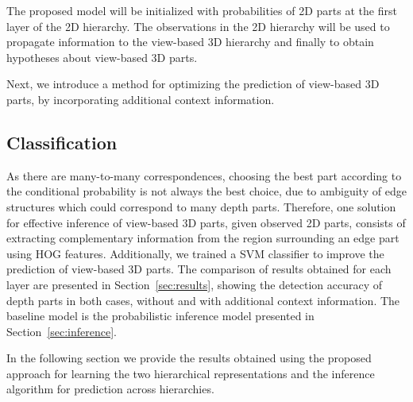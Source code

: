 \documentclass[conference]{IEEEtran}
\begin{document}
The proposed model will be initialized with probabilities of 2D parts at the first layer of the 2D hierarchy. The observations in the 2D hierarchy will be used to propagate information to the view-based 3D hierarchy and finally to obtain hypotheses about view-based 3D parts. 

Next, we introduce a method for optimizing the prediction of view-based 3D parts, by incorporating additional context information.

\subsection{Classification}

As there are many-to-many correspondences, choosing the best part according to the conditional probability is not always the best choice, due to ambiguity of edge structures which could correspond to many depth parts. Therefore, one solution for effective inference of view-based 3D parts, given observed 2D parts, consists of extracting complementary information from the region surrounding an edge part using HOG features. Additionally, we trained a SVM classifier to improve the prediction of view-based 3D parts. 
The comparison of results obtained for each layer are presented in Section~\ref{sec:results}, showing the detection accuracy of depth parts in both cases, without and with additional context information. The baseline model is the probabilistic inference model presented in Section~\ref{sec:inference}.

%

In the following section we provide the results obtained using the proposed approach for learning the two hierarchical representations and the inference algorithm for prediction across hierarchies.
\end{document}
